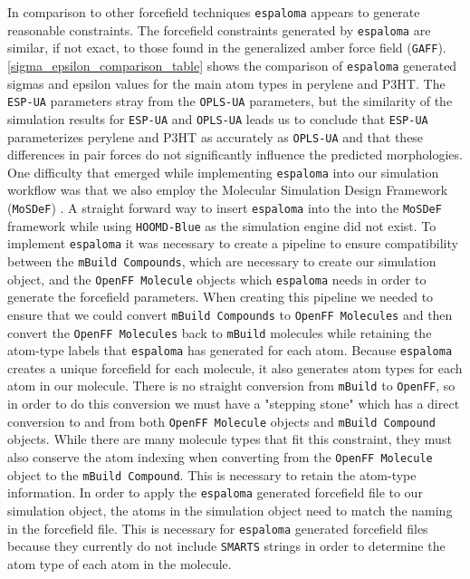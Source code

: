 \par 
In comparison to other forcefield techniques \texttt{espaloma} appears to generate reasonable constraints. The forcefield constraints generated by \texttt{espaloma} are similar, if not exact, to those found in the generalized amber force field (\texttt{GAFF}). \autoref{sigma_epsilon_comparison_table} shows the comparison of \texttt{espaloma} generated sigmas and epsilon values for the main atom types in perylene and P3HT. The \texttt{ESP-UA} parameters stray from the \texttt{OPLS-UA} parameters, but the similarity of the simulation results for \texttt{ESP-UA} and \texttt{OPLS-UA} leads us to conclude that \texttt{ESP-UA} parameterizes perylene and P3HT as accurately as \texttt{OPLS-UA} and that these differences in pair forces do not significantly influence the predicted morphologies. One difficulty that emerged while implementing \texttt{espaloma} into our simulation workflow was that we also employ the Molecular Simulation Design Framework (\texttt{MoSDeF}) \citep{cummings_opensource_2021}. A straight forward way to insert \texttt{espaloma} into the into the \texttt{MoSDeF} framework while using \texttt{HOOMD-Blue} as the simulation engine did not exist. To implement \texttt{espaloma} it was necessary to create a pipeline to ensure compatibility between the \texttt{mBuild Compounds}, which are necessary to create our simulation object, and the \texttt{OpenFF Molecule} objects which \texttt{espaloma} needs in order to generate the forcefield parameters. When creating this pipeline we needed to ensure that we could convert \texttt{mBuild Compounds} to \texttt{OpenFF Molecules} and then convert the \texttt{OpenFF Molecules} back to \texttt{mBuild} molecules while retaining the atom-type labels that \texttt{espaloma} has generated for each atom. Because \texttt{espaloma} creates a unique forcefield for each molecule, it also generates atom types for each atom in our molecule. There is no straight conversion from \texttt{mBuild} to \texttt{OpenFF}, so in order to do this conversion we must have a "stepping stone" which has a direct conversion to and from both \texttt{OpenFF Molecule} objects and \texttt{mBuild Compound} objects. While there are many molecule types that fit this constraint, they must also conserve the atom indexing when converting from the \texttt{OpenFF Molecule} object to the \texttt{mBuild Compound}. This is necessary to retain the atom-type information. In order to apply the \texttt{espaloma} generated forcefield file to our simulation object, the atoms in the simulation object need to match the naming in the forcefield file. This is necessary for \texttt{espaloma} generated forcefield files because they currently do not include \texttt{SMARTS} strings in order to determine the atom type of each atom in the molecule.
